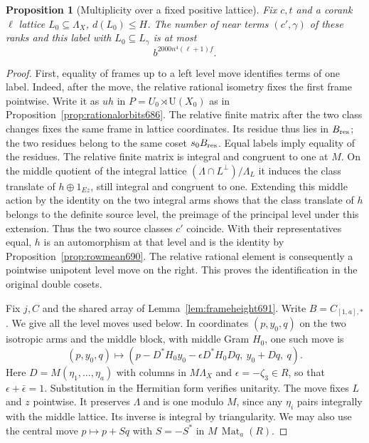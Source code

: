 \documentclass[a4paper,11pt]{article}
\newtheorem{proposition}{Proposition}[section]
\theoremstyle{definition}
\theoremstyle{remark}
\numberwithin{equation}{section}
\begin{document}
\begin{proposition}[Multiplicity over a fixed positive lattice]
\leavevmode\label{prop:fibercount691}
Fix \(c,t\) and a corank \(\ell\) lattice
\(L_0\subseteq\Lambda_X\), \(d(L_0)\le H\).
The number of near terms \((c',\gamma)\) of these ranks and
this label with \(L_0\subseteq L_\gamma\) is at most
\[
                       b^{2000 n^4(\ell+1)f}.
\]
\end{proposition}
\begin{proof}
First, equality of frames up to a left level move identifies
terms of one label. Indeed, after the move, the relative
rational isometry fixes the first frame pointwise. Write it
as \(u h\) in \(P=U_0\rtimes\mathrm U(X_0)\) as in
Proposition~\ref{prop:rationalorbits686}. The relative finite
matrix after the two class changes fixes the same frame in
lattice coordinates. Its residue thus lies in \(B_{\rm res}\);
the two residues belong to the same coset \(s_0 B_{\rm res}\).
Equal labels imply equality of the residues. The relative
finite matrix is integral and congruent to one at \(M\).
On the middle quotient of the integral lattice
\((\Lambda\cap L^\perp)/\Lambda_L\) it induces the class
translate of \(h\oplus 1_{Ez}\), still integral and congruent
to one. Extending this middle action by the identity on the
two integral arms shows that the class translate of \(h\)
belongs to the definite source level, the preimage of the
principal level under this extension. Thus the two source
classes \(c'\) coincide. With their representatives equal,
\(h\) is an automorphism at that level and is the identity
by Proposition~\ref{prop:rowmean690}. The relative rational
element is consequently a pointwise unipotent level move
on the right. This proves the identification in the original
double cosets.

Fix \(j,C\) and the shared array of Lemma~\ref{lem:frameheight691}.
Write \(B=C_{[1,a],*}\). We give all the level moves used
below. In coordinates \((p,y_0,q)\) on the two isotropic
arms and the middle block, with middle Gram \(H_0\), one such
move is
\[
   (p,y_0,q)\longmapsto
   (p-D^*H_0 y_0-\epsilon D^*H_0Dq,\ y_0+Dq,\ q).
\]
Here \(D=M(\eta_1,\ldots,\eta_a)\) with columns in \(M\Lambda_X\)
and \(\epsilon=-\zeta_3\in R\), so that
\(\epsilon+\bar\epsilon=1\). Substitution in the Hermitian
form verifies unitarity. The move fixes \(L\) and \(z\)
pointwise. It preserves \(\Lambda\) and is one modulo \(M\),
since any \(\eta_i\) pairs integrally with the middle lattice.
Its inverse is integral by triangularity. We may also use the
central move \(p\mapsto p+Sq\) with \(S=-S^*\) in
\(M\,\operatorname{Mat}_{a}(R)\).


\end{proof}
\end{document}
